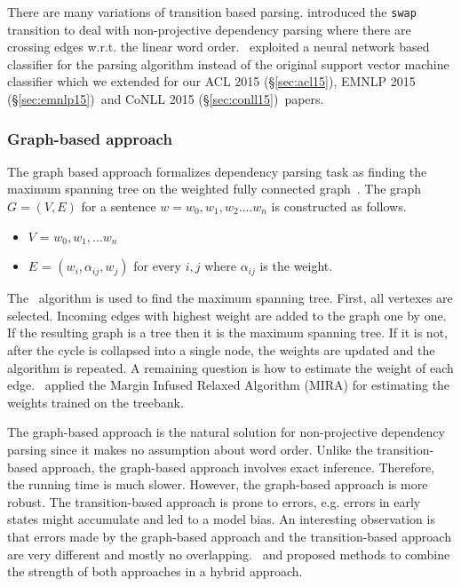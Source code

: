 \documentclass[12pt,twoside,final,hidelinks]{ltthesis}
\theoremstyle{definition}
\newcommand\conllv{CoNLL 2015 (\S\ref{sec:conll15})}
\newcommand\aclv{ACL 2015 (\S\ref{sec:acl15})}
\newcommand\emnlpv{EMNLP 2015 (\S\ref{sec:emnlp15})}
\begin{document}
There are many variations of transition based parsing.  introduced the \texttt{swap} transition to deal with non-projective dependency parsing where there are crossing edges w.r.t. the linear word order.~ exploited a neural network based classifier for the parsing algorithm instead of the original support vector machine classifier which we extended for our \aclv, \emnlpv\ and \conllv\ papers. 

\subsubsection{Graph-based approach }
The graph based approach formalizes dependency parsing task as finding the maximum spanning tree on the weighted fully connected graph~\cite{McDonald:2005:NDP}. The graph $G = (V,E)$ for a sentence $w = w_0,w_1,w_2....w_n$ is constructed as follows. 
\begin{itemize}
\item $V$ = {$w_0,w_1,...w_n$}
\item $E$ = {$(w_i,\alpha_{ij},w_j)$} for every $i,j$ where $\alpha_{ij}$ is the weight. 
\end{itemize}
The~ algorithm is used to find the maximum spanning tree. First, all vertexes are selected. Incoming edges with highest weight are added to the graph one by one. If the resulting graph is a tree then it is the maximum spanning tree. If it is not, after the cycle is collapsed into a single node, the weights are updated and the algorithm is repeated. A remaining question is how to estimate the weight of each edge.~ applied the Margin Infused Relaxed Algorithm (MIRA) for estimating the weights trained on the treebank. 

The graph-based approach is the natural solution for non-projective dependency parsing since it makes no assumption about word order. Unlike the transition-based approach, the graph-based approach involves exact inference. Therefore, the running time is much slower. However, the graph-based approach is more robust. The transition-based approach is prone to errors, e.g. errors in early states might accumulate and led to a model bias. An interesting observation is that errors made by the graph-based approach and the transition-based approach are very different and mostly no overlapping.~ and  proposed methods to combine the strength of both approaches in a hybrid approach. 
\end{document}

